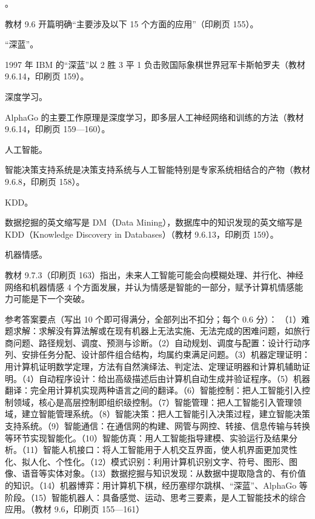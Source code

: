 \documentclass[a4paper,11pt]{article}
\begin{document}

。\begin{analysis}教材 9.6 开篇明确“主要涉及以下 15 个方面的应用”（印刷页 155）。\end{analysis}

\q “深蓝”。\begin{analysis}1997 年 IBM 的“深蓝”以 2 胜 3 平 1 负击败国际象棋世界冠军卡斯帕罗夫（教材 9.6.14，印刷页 159）。\end{analysis}

\q 深度学习。\begin{analysis}AlphaGo 的主要工作原理是深度学习，即多层人工神经网络和训练的方法（教材 9.6.14，印刷页 159—160）。\end{analysis}

\q 人工智能。\begin{analysis}智能决策支持系统是决策支持系统与人工智能特别是专家系统相结合的产物（教材 9.6.8，印刷页 158）。\end{analysis}

\q KDD。\begin{analysis}数据挖掘的英文缩写是 DM（Data Mining），数据库中的知识发现的英文缩写是 KDD（Knowledge Discovery in Databases）（教材 9.6.13，印刷页 159）。\end{analysis}

\q 机器情感。\begin{analysis}教材 9.7.3（印刷页 163）指出，未来人工智能可能会向模糊处理、并行化、神经网络和机器情感 4 个方面发展，并认为情感是智能的一部分，赋予计算机情感能力可能是下一个突破。\end{analysis}


\q 参考答案要点（写出 10 个即可得满分，全部列出不扣分；每个 0.6 分）：
（1）难题求解：求解没有算法解或在现有机器上无法实施、无法完成的困难问题，如旅行商问题、路径规划、调度、预测与诊断。（2）自动规划、调度与配置：设计行动序列、安排任务分配、设计部件组合结构，均属约束满足问题。（3）机器定理证明：用计算机证明数学定理，方法有自然演绎法、判定法、定理证明器和计算机辅助证明。（4）自动程序设计：给出高级描述后由计算机自动生成并验证程序。（5）机器翻译：完全用计算机实现两种语言之间的翻译。（6）智能控制：把人工智能引入控制领域，核心是高层控制即组织级控制。（7）智能管理：把人工智能引入管理领域，建立智能管理系统。（8）智能决策：把人工智能引入决策过程，建立智能决策支持系统。（9）智能通信：在通信网的构建、网管与网控、转接、信息传输与转换等环节实现智能化。（10）智能仿真：用人工智能指导建模、实验运行及结果分析。（11）智能人机接口：将人工智能用于人机交互界面，使人机界面更加灵性化、拟人化、个性化。（12）模式识别：利用计算机识别文字、符号、图形、图像、语音等实体对象。（13）数据挖掘与知识发现：从数据中提取隐含的、有价值的知识。（14）机器博弈：用计算机下棋，经历塞缪尔跳棋、“深蓝”、AlphaGo 等阶段。（15）智能机器人：具备感觉、运动、思考三要素，是人工智能技术的综合应用。（教材 9.6，印刷页 155—161）
\end{document}
